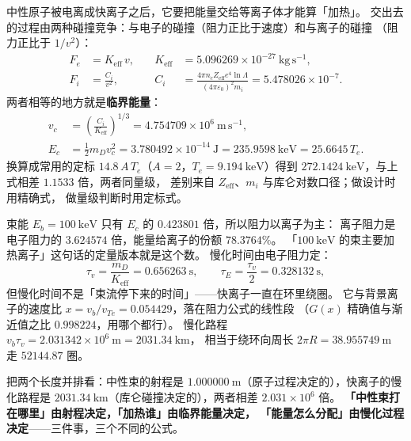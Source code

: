 中性原子被电离成快离子之后，它要把能量交给等离子体才能算「加热」。
交出去的过程由两种碰撞竞争：与电子的碰撞（阻力正比于速度）和与离子的碰撞
（阻力正比于 $1/v^2$）：
\begin{equation}
\begin{aligned}
F_e&=K_\mathrm{eff}\,v, &\quad K_\mathrm{eff}&=5.096269\times10^{-27}\ \mathrm{kg\,s^{-1}},\\
F_i&=\frac{C_i}{v^2}, &\quad C_i&=\frac{4\pi n_eZ_\mathrm{eff}e^4\ln\Lambda}{(4\pi\varepsilon_0)^2m_i}
=5.478026\times10^{-7}.
\end{aligned}
\label{eq:app-ax-drag}
\end{equation}
两者相等的地方就是\textbf{临界能量}：
\begin{equation}
\begin{aligned}
v_c&=\left(\frac{C_i}{K_\mathrm{eff}}\right)^{1/3}=4.754709\times10^{6}\ \mathrm{m\,s^{-1}},\\
E_c&=\frac{1}{2}m_Dv_c^2=3.780492\times10^{-14}\ \mathrm{J}=235.9598\ \mathrm{keV}=25.6645\,T_e.
\end{aligned}
\label{eq:app-ax-ec}
\end{equation}
换算成常用的定标 $14.8\,A\,T_e$（$A=2$，$T_e=9.194\ \mathrm{keV}$）得到
$272.1424\ \mathrm{keV}$，与上式相差 $1.1533$ 倍，两者同量级，
差别来自 $Z_\mathrm{eff}$、$m_i$ 与库仑对数口径；做设计时用精确式，
做量级判断时用定标式。

束能 $E_b=100\ \mathrm{keV}$ 只有 $E_c$ 的 $0.423801$ 倍，所以阻力以离子为主：
离子阻力是电子阻力的 $3.624574$ 倍，能量给离子的份额 $78.3764\%$。
「$100\ \mathrm{keV}$ 的束主要加热离子」这句话的定量版本就是这个数。
慢化时间由电子阻力定：
\begin{equation}
\tau_v=\frac{m_D}{K_\mathrm{eff}}=0.656263\ \mathrm{s},
\qquad
\tau_E=\frac{\tau_v}{2}=0.328132\ \mathrm{s},
\label{eq:app-ax-tau}
\end{equation}
但慢化时间不是「束流停下来的时间」——快离子一直在环里绕圈。
它与背景离子的速度比 $x=v_b/v_{Te}=0.054429$，落在阻力公式的线性段
（$G(x)$ 精确值与渐近值之比 $0.998224$，用哪个都行）。
慢化路程 $v_b\tau_v=2.031342\times10^{6}\ \mathrm{m}=2031.34\ \mathrm{km}$，
相当于绕环向周长 $2\pi R=38.955749\ \mathrm{m}$ 走 $52144.87$ 圈。

把两个长度并排看：中性束的射程是
$1.000000\ \mathrm{m}$（原子过程决定的），快离子的慢化路程是
$2031.34\ \mathrm{km}$（库仑碰撞决定的），两者相差 $2.031\times10^{6}$ 倍。
\textbf{「中性束打在哪里」由射程决定，「加热谁」由临界能量决定，
「能量怎么分配」由慢化过程决定}——三件事，三个不同的公式。

